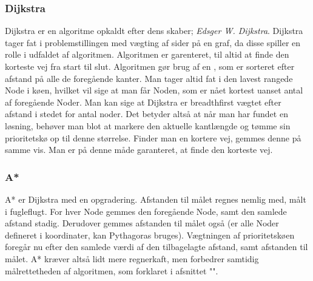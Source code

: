 \documentclass[a4paper, 12pt]{article}
\begin{document}
\subsubsection{Dijkstra}\label{subsubsec:dijk}
Dijkstra er en algoritme opkaldt efter dens skaber; \textit{Edsger W. Dijkstra}.\cite{dijkstra} Dijkstra tager fat i problemstillingen med vægting af sider på en graf, da disse spiller en rolle i udfaldet af algoritmen. Algoritmen er garenteret, til altid at finde den korteste vej fra start til slut. Algoritmen gør brug af en , som er sorteret efter afstand på alle de foregående kanter. Man tager altid fat i den lavest rangede Node i køen, hvilket vil sige at man får Noden, som er nået kortest uanset antal af foregående Noder. Man kan sige at Dijkstra er breadthfirst vægtet efter afstand i stedet for antal noder. Det betyder altså at når man har fundet en løsning, behøver man blot at markere den aktuelle kantlængde og tømme sin prioritetskø op til denne størrelse. Finder man en kortere vej, gemmes denne på samme vis. Man er på denne måde garanteret, at finde den korteste vej.
\subsubsection{A*}
A* er Dijkstra med en opgradering. Afstanden til målet regnes nemlig med, målt i fugleflugt. For hver Node gemmes den foregående Node, samt den samlede afstand stadig. Derudover gemmes afstanden til målet også (er alle Noder defineret i koordinater, kan Pythagoras bruges). Vægtningen af prioritetskøen foregår nu efter den samlede værdi af den tilbagelagte afstand, samt afstanden til målet. A* kræver altså lidt mere regnerkaft, men forbedrer samtidig målrettetheden af algoritmen, som forklaret i afsnittet "".


\newpage
\end{document}
